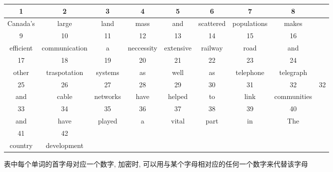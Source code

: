 \documentclass[UTF8]{ctexart}
\begin{document}
\begin{itemize}
\begin{itemize}
            \begin{tabular}{|c|c|c|c|c|c|c|c|c|}
                \hline
                1 &2 &3 &4 &5 &6 &7 &8\\
                \hline
                Canada's &large &land &mass &and &scattered &populations &makes\\
                \hline
                9 &10 &11 &12 &13 &14 &15 &16\\
                \hline
                efficient &communication &a &neccessity &extensive &railway &road &and\\
                \hline
                17 &18 &19 &20 &21 &22 &23 &24\\
                \hline
                other &traspotation &systems &as &well &as &telephone &telegraph\\
                \hline
                25 &26 &27 &28 &29 &30 &31 &32 &32\\
                \hline
                and &cable &networks &have &helped &to &link &communities\\
                \hline
                33 &34 &35 &36 &37 &38 &39 &40\\
                \hline
                and &have &played &a &vital &part &in &The\\
                \hline
                41 &42 & & & & & &\\
                \hline
                country &development & & & & & &\\
                \hline
            \end{tabular}

            表中每个单词的首字母对应一个数字, 加密时, 可以用与某个字母相对应的任何一个数字来代替该字母

        \end{itemize}
    \end{itemize}
\end{document}
